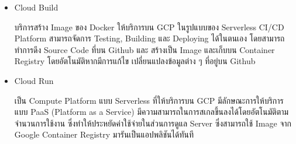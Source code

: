 \documentclass[12pt,oneside,openright,a4paper]{cpe-thai-project}
\begin{document}
\begin{itemize}
      \item Cloud Build
      
      \hspace{1cm}บริการสร้าง Image ของ Docker ให้บริการบน GCP ในรูปแบบของ Serverless CI/CD Platform 
      สามารถจัดการ Testing, Building และ Deploying ได้ในตนเอง โดยสามารถทำการดึง Source Code ที่บน Github และ สร้างเป็น Image 
      และเก็บบน Container Registry โดยอัตโนมัติหากมีการแก้ไข เปลี่ยนแปลงข้อมูลต่าง ๆ ที่อยู่บน Github \cite{cloud_build}

      \item Cloud Run
      
      \hspace{1cm}เป็น Compute Platform แบบ Serverless ที่ให้บริการบน GCP มีลักษณะการให้บริการแบบ PaaS (Platform as a Service) 
      มีความสามารถในการสเกลขึ้นลงได้โดยอัตโนมัติตามจำนวนการใช้งาน 
      ซึ่งทำให้ประหยัดค่าใช้จ่ายในส่วนการดูแล Server ซึ่งสามารถใช้ Image จาก Google Container Registry มารันเป็นแอปพลิชันได้ทันที \cite{cloud_run}
    \end{itemize}
\end{document}
